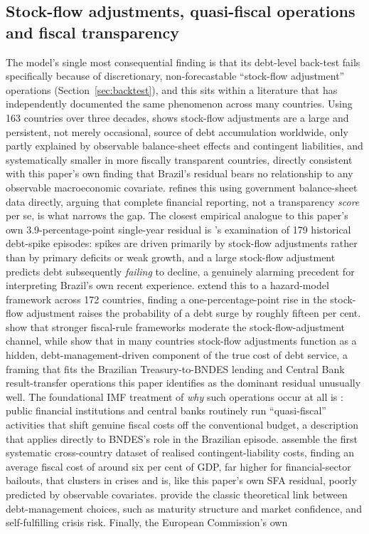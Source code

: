 \documentclass[11pt,a4paper]{article}
\begin{document}
\subsection{Stock-flow adjustments, quasi-fiscal operations and fiscal transparency}
\label{sec:lit-sfa}

The model's single most consequential finding is that its debt-level back-test fails specifically because of discretionary, non-forecastable ``stock-flow adjustment'' operations (Section~\ref{sec:backtest}), and this sits within a literature that has independently documented the same phenomenon across many countries. Using 163 countries over three decades, \citet{weber2012sfa} shows stock-flow adjustments are a large and persistent, not merely occasional, source of debt accumulation worldwide, only partly explained by observable balance-sheet effects and contingent liabilities, and systematically smaller in more fiscally transparent countries, directly consistent with this paper's own finding that Brazil's residual bears no relationship to any observable macroeconomic covariate. \citet{seiferling2013} refines this using government balance-sheet data directly, arguing that complete financial reporting, not a transparency \emph{score} per se, is what narrows the gap. The closest empirical analogue to this paper's own 3.9-percentage-point single-year residual is \citet{jaramilloetal2017}'s examination of 179 historical debt-spike episodes: spikes are driven primarily by stock-flow adjustments rather than by primary deficits or weak growth, and a large stock-flow adjustment predicts debt subsequently \emph{failing} to decline, a genuinely alarming precedent for interpreting Brazil's own recent experience. \citet{andrianetal2024sfa} extend this to a hazard-model framework across 172 countries, finding a one-percentage-point rise in the stock-flow adjustment raises the probability of a debt surge by roughly fifteen per cent. \citet{afonsojalles2019sfa} show that stronger fiscal-rule frameworks moderate the stock-flow-adjustment channel, while \citet{casalinetal2023} show that in many countries stock-flow adjustments function as a hidden, debt-management-driven component of the true cost of debt service, a framing that fits the Brazilian Treasury-to-BNDES lending and Central Bank result-transfer operations this paper identifies as the dominant residual unusually well. The foundational IMF treatment of \emph{why} such operations occur at all is \citet{mackenziestella1996}: public financial institutions and central banks routinely run ``quasi-fiscal'' activities that shift genuine fiscal costs off the conventional budget, a description that applies directly to BNDES's role in the Brazilian episode. \citet{bovaetal2016contingent} assemble the first systematic cross-country dataset of realised contingent-liability costs, finding an average fiscal cost of around six per cent of GDP, far higher for financial-sector bailouts, that clusters in crises and is, like this paper's own SFA residual, poorly predicted by observable covariates. \citet{alesinapratitabellini1989} provide the classic theoretical link between debt-management choices, such as maturity structure and market confidence, and self-fulfilling crisis risk. Finally, the European Commission's own 
\end{document}
